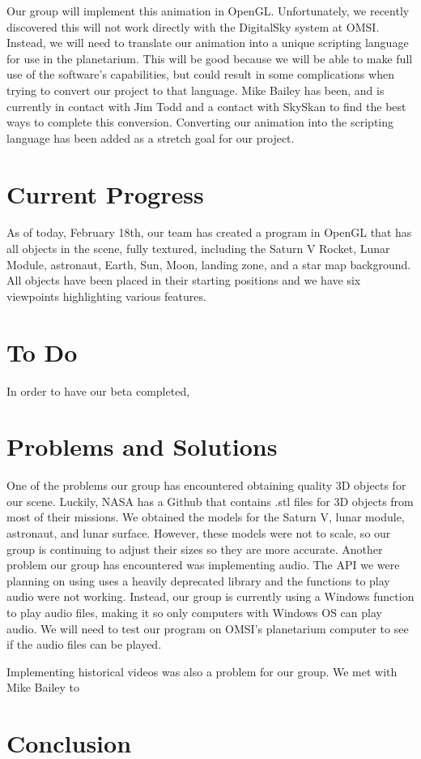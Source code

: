 \documentclass[onecolumn, draftclsnofoot,10pt, compsoc]{IEEEtran}
\begin{document}
Our group will implement this animation in OpenGL. Unfortunately, we recently discovered this will not work directly with the DigitalSky system at OMSI. Instead, we will need to translate our animation into a unique scripting language for use in the planetarium. This will be good because we will be able to make full use of the software's capabilities, but could result in some complications when trying to convert our project to that language. Mike Bailey has been, and is currently in contact with Jim Todd and a contact with SkySkan to find the best ways to complete this conversion. Converting our animation into the scripting language has been added as a stretch goal for our project.

\section{Current Progress}
As of today, February 18th, our team has created a program in OpenGL that has all objects in the scene, fully textured, including the Saturn V Rocket, Lunar Module, astronaut, Earth, Sun, Moon, landing zone, and a star map background. All objects have been placed in their starting positions and we have six viewpoints highlighting various features.

\section{To Do}
In order to have our beta completed, 





\section{Problems and Solutions}
One of the problems our group has encountered obtaining quality 3D objects for our scene. Luckily, NASA has a Github that contains .stl files for 3D objects from most of their missions. We obtained the models for the Saturn V, lunar module, astronaut, and lunar surface. However, these models were not to scale, so our group is continuing to adjust their sizes so they are more accurate. Another problem our group has encountered was implementing audio. The API we were planning on using uses a heavily deprecated library and the functions to play audio were not working. Instead, our group is currently using a Windows function to play audio files, making it so only computers with Windows OS can play audio. We will need to test our program on OMSI's planetarium computer to see if the audio files can be played. 

Implementing historical videos was also a problem for our group. We met with Mike Bailey to 


\section{Conclusion}
\end{document}
